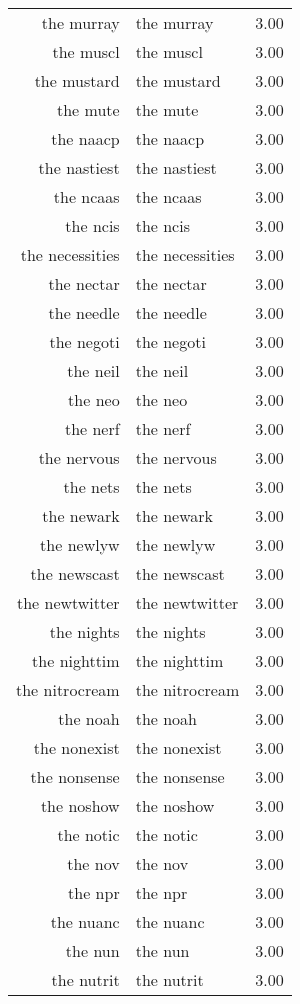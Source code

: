 \begin{table}[ht]
\begin{tabular}{rlr}
  the murray & the murray & 3.00 \\ 
  the muscl & the muscl & 3.00 \\ 
  the mustard & the mustard & 3.00 \\ 
  the mute & the mute & 3.00 \\ 
  the naacp & the naacp & 3.00 \\ 
  the nastiest & the nastiest & 3.00 \\ 
  the ncaas & the ncaas & 3.00 \\ 
  the ncis & the ncis & 3.00 \\ 
  the necessities & the necessities & 3.00 \\ 
  the nectar & the nectar & 3.00 \\ 
  the needle & the needle & 3.00 \\ 
  the negoti & the negoti & 3.00 \\ 
  the neil & the neil & 3.00 \\ 
  the neo & the neo & 3.00 \\ 
  the nerf & the nerf & 3.00 \\ 
  the nervous & the nervous & 3.00 \\ 
  the nets & the nets & 3.00 \\ 
  the newark & the newark & 3.00 \\ 
  the newlyw & the newlyw & 3.00 \\ 
  the newscast & the newscast & 3.00 \\ 
  the newtwitter & the newtwitter & 3.00 \\ 
  the nights & the nights & 3.00 \\ 
  the nighttim & the nighttim & 3.00 \\ 
  the nitrocream & the nitrocream & 3.00 \\ 
  the noah & the noah & 3.00 \\ 
  the nonexist & the nonexist & 3.00 \\ 
  the nonsense & the nonsense & 3.00 \\ 
  the noshow & the noshow & 3.00 \\ 
  the notic & the notic & 3.00 \\ 
  the nov & the nov & 3.00 \\ 
  the npr & the npr & 3.00 \\ 
  the nuanc & the nuanc & 3.00 \\ 
  the nun & the nun & 3.00 \\ 
  the nutrit & the nutrit & 3.00 \\ 

\end{tabular}
\end{table}
